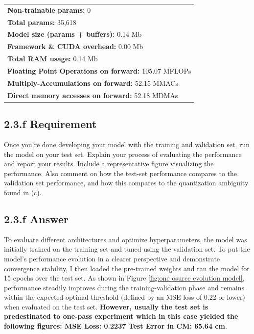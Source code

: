 \documentclass{vgtc}                          %
\begin{document}
\begin{table}[htbp]
\begin{tabular}{llcrr}
        \multicolumn{5}{l}{\textbf{Non-trainable params:} 0} \\
        \multicolumn{5}{l}{\textbf{Total params:} 35,618} \\
        \midrule
        \multicolumn{5}{l}{\textbf{Model size (params + buffers):} 0.14 Mb} \\
        \multicolumn{5}{l}{\textbf{Framework \& CUDA overhead:} 0.00 Mb} \\
        \multicolumn{5}{l}{\textbf{Total RAM usage:} 0.14 Mb} \\
        \midrule
        \multicolumn{5}{l}{\textbf{Floating Point Operations on forward:} 105.07 MFLOPs} \\
        \multicolumn{5}{l}{\textbf{Multiply-Accumulations on forward:} 52.15 MMACs} \\
        \multicolumn{5}{l}{\textbf{Direct memory accesses on forward:} 52.18 MDMAs} \\
        \bottomrule
    \end{tabular}
\end{table}



\subsection{2.3.f Requirement}
Once you’re done developing your model with the training and validation set, run
the model on your test set. Explain your process of evaluating the performance and
report your results. Include a representative figure visualizing the performance. Also
comment on how the test-set performance compares to the validation set performance,
and how this compares to the quantization ambiguity found in (c).
\subsection{2.3.f Answer}
To evaluate different architectures and optimize hyperparameters, the model was initially trained on the training set and tuned using the validation set. To put the model's performance evolution in a clearer perspective and demonstrate convergence stability, I then loaded the pre-trained weights and ran the model for 15 epochs over the test set. As shown in Figure \ref{fig:one osurce evolution model}, performance steadily improves during the training-validation phase and remains within the expected optimal threshold (defined by an MSE loss of 0.22 or lower) when evaluated on the test set. \textbf{However, usually the test set is predestinated to one-pass experiment which in this case yielded the following figures: MSE Loss: 0.2237 Test Error in CM: 65.64 cm}.
\end{document}
